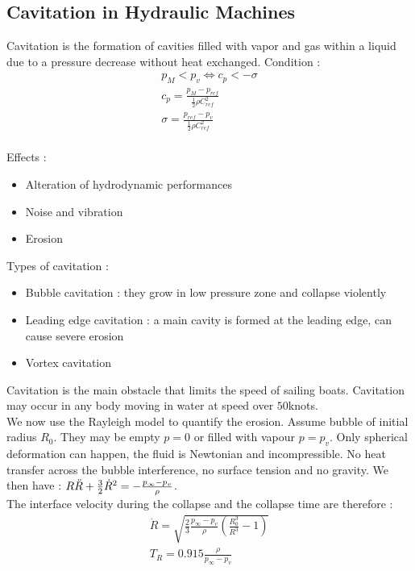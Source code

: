 \documentclass[../main.tex]{subfiles}
\begin{document}
\subsection{Cavitation in Hydraulic Machines}
Cavitation is the formation of cavities filled with vapor and gas within a liquid due to a pressure decrease without heat exchanged. Condition : \begin{equation}
    \begin{gathered}
        p_M < p_v \Leftrightarrow c_p < -\sigma\\
        c_p = \frac{p_M - p_{ref}}{\frac{1}{2} \rho C_{ref}^2}\\
        \sigma = \frac{p_{ref} - p_v}{\frac{1}{2} \rho C_{ref}^2}\\
    \end{gathered}
\end{equation}

Effects : \begin{itemize}
    \item Alteration of hydrodynamic performances
    \item Noise and vibration
    \item Erosion
\end{itemize}

Types of cavitation : \begin{itemize}
    \item Bubble cavitation : they grow in low pressure zone and collapse violently
    \item Leading edge cavitation : a main cavity is formed at the leading edge, can cause severe erosion
    \item Vortex cavitation
\end{itemize}

Cavitation is the main obstacle that limits the speed of sailing boats. Cavitation may occur in any body moving in water at speed over $50$knots.\\

We now use the Rayleigh model to quantify the erosion. Assume bubble of initial radius $R_0$. They may be empty $p=0$ or filled with vapour $p = p_v$. Only spherical deformation can happen, the fluid is Newtonian and incompressible. No heat transfer across the bubble interference, no surface tension and no gravity. We then have : $R \Ddot{R} + \frac{3}{2} \dot{R}^2 = -\frac{p_\infty - p_v}{\rho}$.\\
The interface velocity during the collapse and the collapse time are therefore : \begin{equation}
\begin{gathered}
    \dot{R} = \sqrt{ \frac{2}{3} \frac{p_\infty - p_v}{\rho} (\frac{R_0^3}{R^3}-1)}\\
    T_R = 0.915 \frac{\rho}{p_\infty - p_v}\\
    \end{gathered}
\end{equation}
\end{document}

